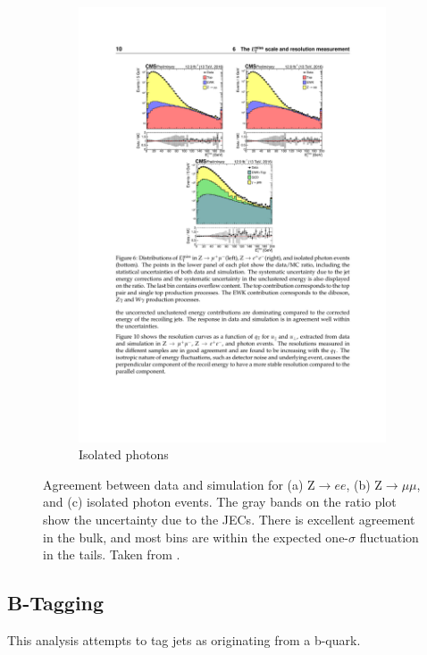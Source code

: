 \begin{figure}[!htb]
\begin{subfigure}[t]{0.31\textwidth}
          \includegraphics[width=\textwidth]{figures/met_resolution_gamma.pdf}
          \caption{Isolated photons}
          \label{fig:met_resolution_gamma}
        \end{subfigure}
        \caption{Agreement between data and simulation for (a) Z$\to ee$, (b) Z$\to \mu\mu$, and (c) isolated photon events. The gray bands on the ratio plot show the uncertainty due to the JECs. There is excellent agreement in the bulk, and most bins are within the expected one-$\sigma$ fluctuation in the tails. Taken from \cite{cms_met}.}
        \label{fig:met_resolution}
      \end{figure}

  \subsection{B-Tagging} \label{sec:b-tagging}
    This analysis attempts to tag jets as originating from a b-quark.


